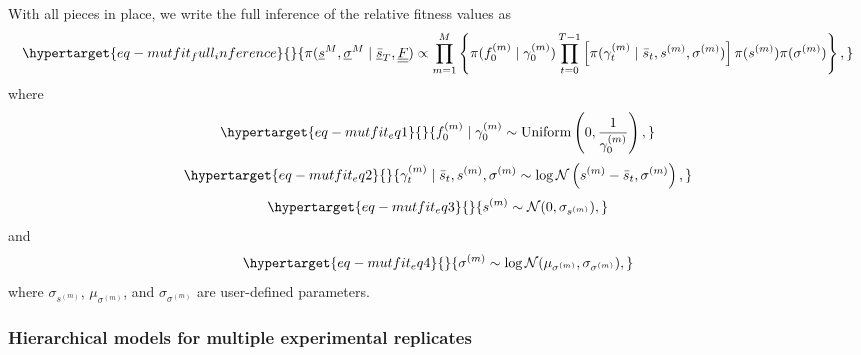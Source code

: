 \documentclass[
  letterpaper,
  DIV=11,
  numbers=noendperiod]{scrartcl}
\begin{document}
\begin{refsegment}
With all pieces in place, we write the full inference of the relative
fitness values as
\begin{equation}\protect\hypertarget{eq-mutfit_full_inference}{}{
\pi(
    \underline{s}^M ,\underline{\sigma}^M \mid 
    \underline{\bar{s}}_T, \underline{\underline{F}}
) \propto
\prod_{m=1}^M \left\{ 
    \pi(f_0^{(m)} \mid \gamma_0^{(m)})
    \prod_{t=0}^{T-1} \left[
        \pi(\gamma_t^{(m)} \mid \bar{s}_t, s^{(m)}, \sigma^{(m)})
    \right]
    \pi(s^{(m)}) \pi(\sigma^{(m)})
\right\},
}\label{eq-mutfit_full_inference}\end{equation} where
\begin{equation}\protect\hypertarget{eq-mutfit_eq1}{}{
f_0^{(m)} \mid \gamma_0^{(m)} \sim 
\operatorname{Uniform}\left(0, \frac{1}{\gamma_0^{(m)}} \right),
}\label{eq-mutfit_eq1}\end{equation}
\begin{equation}\protect\hypertarget{eq-mutfit_eq2}{}{
\gamma_t^{(m)} \mid \bar{s}_t, s^{(m)}, \sigma^{(m)} \sim 
\log\mathcal{N}\left(s^{(m)} - \bar{s}_t, \sigma^{(m)} \right),
}\label{eq-mutfit_eq2}\end{equation}
\begin{equation}\protect\hypertarget{eq-mutfit_eq3}{}{
s^{(m)} \sim \mathcal{N}(0, \sigma_{s^{(m)}}),
}\label{eq-mutfit_eq3}\end{equation} and
\begin{equation}\protect\hypertarget{eq-mutfit_eq4}{}{
\sigma^{(m)} \sim \log\mathcal{N}(\mu_{\sigma^{(m)}}, \sigma_{\sigma^{(m)}}),
}\label{eq-mutfit_eq4}\end{equation} where \(\sigma_{s^{(m)}}\),
\(\mu_{\sigma^{(m)}}\), and \(\sigma_{\sigma^{(m)}}\) are user-defined
parameters.

\hypertarget{sec-hierarchical_model}{%
\subsubsection{Hierarchical models for multiple experimental
replicates}\label{sec-hierarchical_model}}


\end{refsegment}
\end{document}
